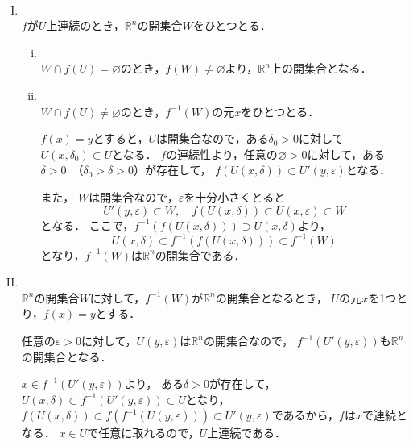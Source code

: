 \begin{tproof} \mbox{　}
    \begin{enumerate}[(I)]
        \item \mbox{} \\
              $f$が$U$上連続のとき，$\mathbb{R}^n$の開集合$W$をひとつとる．
              \begin{enumerate}[(i)]
                  \item \mbox{} \\
                        $ W \cap f(U) = \varnothing$のとき，$f(W) \ne \varnothing$より，$\mathbb{R}^n$上の開集合となる．
                  \item \mbox{} \\
                        $ W \cap f(U) \ne \varnothing$のとき，$f^{-1} (W)$の元$x$をひとつとる．

                        $ f(x)=y$とすると，$U$は開集合なので，ある$\delta_0 >0$に対して$U(x,\delta_0) \subset U$となる．
                        $f$の連続性より，任意の$\varnothing >0$に対して，ある$\delta >0$~（$\delta_0 >\delta >0$）が存在して，
                        $f(U(x,\delta)) \subset U' (y,\varepsilon)$となる．

                        また， $W$は開集合なので，$\varepsilon$を十分小さくとると
                        \[
                            U'(y,\varepsilon) \subset W,\quad f(U(x,\delta)) \subset U (x,\varepsilon) \subset W
                        \]
                        となる．
                        ここで，$f^{-1} (f(U(x,\delta))) \supset U(x,\delta)$より，
                        \[
                            U(x,\delta) \subset f^{-1} (f(U(x,\delta))) \subset f^{-1} (W)
                        \]
                        となり，$f^{-1} (W)$は$\mathbb{R}^n$の開集合である．
              \end{enumerate}
        \item \mbox{} \\
              $ \mathbb{R}^n$の開集合$W$に対して，$f^{-1} (W)$が$\mathbb{R}^n$の開集合となるとき，
              $U$の元$x$を1つとり，$f(x)=y$とする．

              任意の$\varepsilon >0$に対して，$U(y,\varepsilon)$は$\mathbb{R}^n$の開集合なので，
              $f^{-1} (U'(y,\varepsilon))$も$\mathbb{R}^n$の開集合となる．

              $x \in f^{-1} (U'(y,\varepsilon))$より，
              ある$\delta >0$が存在して，$U(x,\delta) \subset  f^{-1}(U'(y,\varepsilon)) \subset U$となり，
              $f(U(x,\delta)) \subset f(f^{-1}(U(y,\varepsilon))) \subset U'(y,\varepsilon)$であるから，$f$は$x$で連続となる．
              $x \in U$で任意に取れるので，$U$上連続である．
    \end{enumerate}
\end{tproof}



